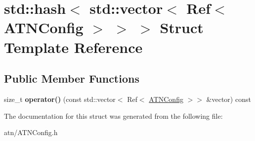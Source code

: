 \hypertarget{structstd_1_1hash_3_01std_1_1vector_3_01Ref_3_01ATNConfig_01_4_01_4_01_4}{}\section{std\+:\+:hash$<$ std\+:\+:vector$<$ Ref$<$ A\+T\+N\+Config $>$ $>$ $>$ Struct Template Reference}
\label{structstd_1_1hash_3_01std_1_1vector_3_01Ref_3_01ATNConfig_01_4_01_4_01_4}
\subsection*{Public Member Functions}
\begin{DoxyCompactItemize}
\item 
\mbox{\label{structstd_1_1hash_3_01std_1_1vector_3_01Ref_3_01ATNConfig_01_4_01_4_01_4_a3a66b092cd139fd19bcd0fb03a98358e}} 
size\+\_\+t {\bfseries operator()} (const std\+::vector$<$ Ref$<$ \hyperlink{classantlr4_1_1atn_1_1ATNConfig}{A\+T\+N\+Config} $>$$>$ \&vector) const
\end{DoxyCompactItemize}


The documentation for this struct was generated from the following file\+:\begin{DoxyCompactItemize}
\item 
atn/A\+T\+N\+Config.\+h\end{DoxyCompactItemize}
